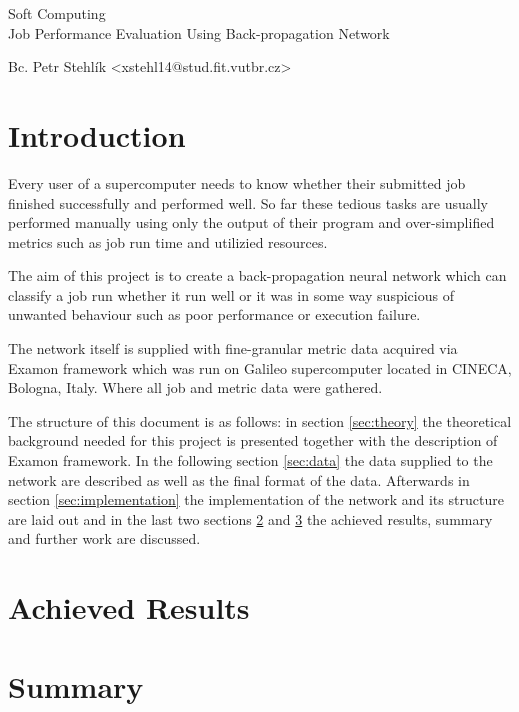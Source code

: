 \documentclass[11pt,a4paper]{article}
\begin{document}
\begin{center}
	\LARGE{Soft Computing}\\
	\Large{Job Performance Evaluation Using Back-propagation Network}
	\vspace{0.5cm}

    \begin{centering}
    \small{
        Bc. Petr Stehlík <xstehl14@stud.fit.vutbr.cz>
        }
    \end{centering}

	\vspace{0.2cm}

\end{center}

\section{Introduction}
Every user of a supercomputer needs to know whether their submitted job finished successfully and performed well. So far these tedious tasks are usually performed manually using only the output of their program and over-simplified metrics such as job run time and utilizied resources.

The aim of this project is to create a back-propagation neural network which can classify a job run whether it run well or it was in some way suspicious of unwanted behaviour such as poor performance or execution failure.

The network itself is supplied with fine-granular metric data acquired via Examon framework\cite{examon} which was run on Galileo supercomputer located in CINECA, Bologna, Italy. Where all job and metric data were gathered.

The structure of this document is as follows: in section \ref{sec:theory} the theoretical background needed for this project is presented together with the description of Examon framework. In the following section \ref{sec:data} the data supplied to the network are described as well as the final format of the data. Afterwards in section \ref{sec:implementation} the implementation of the network and its structure are laid out and in the last two sections \ref{sec:res} and \ref{sec:sum} the achieved results, summary and further work are discussed.







\section{Achieved Results}
\label{sec:res}

\section{Summary}
\label{sec:sum}

{}

\end{document}
